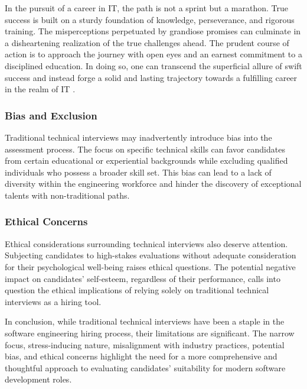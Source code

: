 \documentclass[
    a4paper, %
    10pt, %
    unnumberedsections, %
    twoside, %
]{LTJournalArticle}
\begin{document}
In the pursuit of a career in IT, the path is not a sprint but a marathon. True success is built on a sturdy foundation of knowledge, perseverance, and rigorous training. The misperceptions perpetuated by grandiose promises can culminate in a disheartening realization of the true challenges ahead. The prudent course of action is to approach the journey with open eyes and an earnest commitment to a disciplined education. In doing so, one can transcend the superficial allure of swift success and instead forge a solid and lasting trajectory towards a fulfilling career in the realm of IT \cite{tetlock2007illusion}.











\subsubsection*{Bias and Exclusion}

Traditional technical interviews may inadvertently introduce bias into the assessment process. The focus on specific technical skills can favor candidates from certain educational or experiential backgrounds while excluding qualified individuals who possess a broader skill set. This bias can lead to a lack of diversity within the engineering workforce and hinder the discovery of exceptional talents with non-traditional paths.

\subsubsection*{Ethical Concerns}

Ethical considerations surrounding technical interviews also deserve attention. Subjecting candidates to high-stakes evaluations without adequate consideration for their psychological well-being raises ethical questions. The potential negative impact on candidates' self-esteem, regardless of their performance, calls into question the ethical implications of relying solely on traditional technical interviews as a hiring tool.

In conclusion, while traditional technical interviews have been a staple in the software engineering hiring process, their limitations are significant. The narrow focus, stress-inducing nature, misalignment with industry practices, potential bias, and ethical concerns highlight the need for a more comprehensive and thoughtful approach to evaluating candidates' suitability for modern software development roles.
\end{document}
